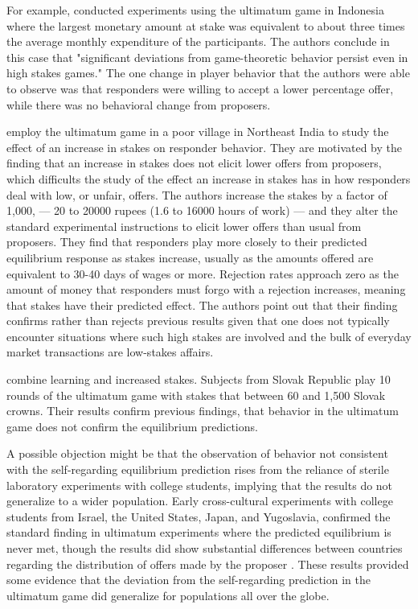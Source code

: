 \documentclass[12pt]{article}
\begin{document}
For example, \cite{cameron1999raising} conducted experiments using the ultimatum game in Indonesia where the largest monetary amount at stake was equivalent to about three times the average monthly expenditure of the participants. The authors conclude in this case that "significant deviations from game-theoretic behavior persist even in high stakes games." The one change in player behavior that the authors were able to observe was that responders were willing to accept a lower percentage offer, while there was no behavioral change from proposers. 

\cite{andersen2011stakes} employ the ultimatum game in a poor village in Northeast India to study the effect of an increase in stakes on responder behavior. They are motivated by the finding that an increase in stakes does not elicit lower offers from proposers, which difficults the study of the effect an increase in stakes has in how responders deal with low, or unfair, offers. The authors increase the stakes by a factor of 1,000, --- 20 to 20000 rupees (1.6 to 16000 hours of work) --- and they alter the standard experimental instructions to elicit lower offers than usual from proposers. They find that responders play more closely to their predicted equilibrium response as stakes increase, usually as the amounts offered are equivalent to 30-40 days of wages or more. Rejection rates approach zero as the amount of money that responders must forgo with a rejection increases, meaning that stakes have their predicted effect. The authors point out that their finding confirms rather than rejects previous results given that one does not typically encounter situations where such high stakes are involved and the bulk of everyday market transactions are low-stakes affairs.


\cite{slonim1998learning} combine learning and increased stakes. Subjects from Slovak Republic play 10 rounds of the ultimatum game with stakes that between 60 and 1,500 Slovak crowns. Their results confirm previous findings, that behavior in the ultimatum game does not confirm the equilibrium predictions. 

A possible objection might be that the observation of behavior not consistent with the self-regarding equilibrium prediction rises from the reliance of sterile laboratory experiments with college students, implying that the results do not generalize to a wider population. Early cross-cultural experiments with college students from Israel, the United States, Japan, and Yugoslavia, confirmed the standard finding in ultimatum experiments where the predicted equilibrium is never met, though the results did show substantial differences between countries regarding the distribution of offers made by the proposer \citep{roth1991}. These results provided some evidence that the deviation from the self-regarding prediction in the ultimatum game did generalize for populations all over the globe. 
\end{document}
